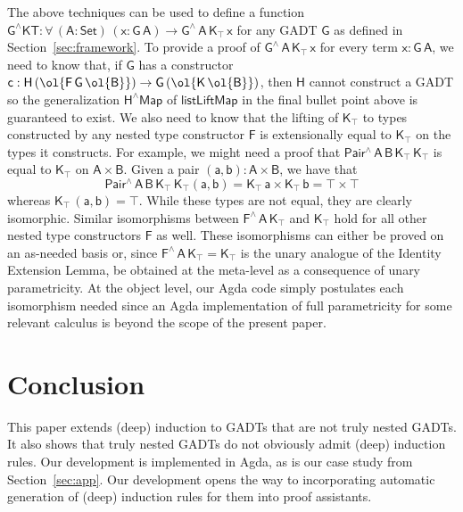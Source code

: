 \documentclass[sigplan,10pt,anonymous,review]{acmart}
\begin{document}
The above techniques can be used to define a function
$\mathsf{G^\wedge KT : \forall\, (A : Set)\, (x : G\,A) \to
  G^{\wedge}\, A\, K_\top\, x}$ for any GADT $\mathsf{G}$ as defined
in Section~\ref{sec:framework}.  To provide a proof of
$\mathsf{G^{\wedge}\, A\, K_\top \, x}$ for every term $\mathsf{x :
  G\, A}$, we need to know that, if $\mathsf{G}$ has a constructor
$\mathsf{c : H \, (\ol{F\,G\, \ol{B}}) \to G\, (\ol{K\,\ol{B}})}$,
then $\mathsf{H}$ cannot construct a GADT so the generalization
$\mathsf{H^\wedge Map}$ of $\mathsf{listLiftMap}$ in the final bullet
point above is guaranteed to exist. We also need to know that the
lifting of $\mathsf{K_\top}$ to types constructed by any nested type
constructor $\mathsf{F}$ is extensionally equal to $\mathsf{K_\top}$
on the types it constructs. For example, we might need a proof that
$\mathsf{Pair^{\wedge}\,A\,B\,K_\top\,K_\top}$ is equal to
$\mathsf{K_\top}$ on $\mathsf{A \times B}$.  Given a pair $\mathsf{(a
  , b) : A \times B}$, we have that
\[\mathsf{Pair^{\wedge}\,A\,B\,K_\top\,K_\top (a, b) = K_\top \, a
  \times K_\top\, b = \top \times \top}\] whereas $\mathsf{K_\top\,
  (a, b) = \top}$. While these types are not equal, they are clearly
isomorphic. Similar isomorphisms between
$\mathsf{F^{\wedge}\,A\,K_\top}$ and $\mathsf{K_\top}$ hold for all
other nested type constructors $\mathsf{F}$ as well. These
isomorphisms can either be proved on an as-needed basis or, since
$\mathsf{F^\wedge\,A\,K_\top = K_\top}$ is the unary analogue of the
Identity Extension Lemma, be obtained at the meta-level as a
consequence of unary parametricity. At the object level, our Agda
code
simply postulates each isomorphism needed since
an Agda implementation of full parametricity for some relevant
calculus is beyond the scope of the present paper.

\section{Conclusion}\label{sec:conclusion}

This paper extends (deep) induction to GADTs that are not truly nested
GADTs. It also shows that truly nested GADTs do not obviously admit
(deep) induction rules. Our development is implemented in Agda, as is
our case study from Section~\ref{sec:app}. Our development opens the
way to incorporating automatic generation of (deep) induction rules
for them into proof assistants.



\end{document}
